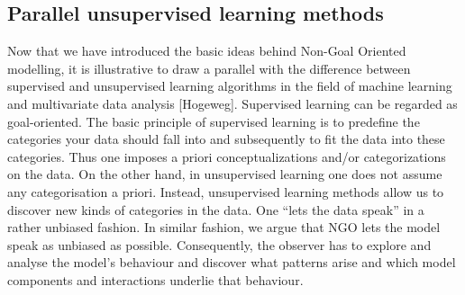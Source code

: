 \subsection{Parallel unsupervised learning methods}

Now that we have introduced the basic ideas behind Non-Goal Oriented modelling, it is illustrative to draw a parallel with the difference between supervised and unsupervised learning algorithms in the field of machine learning and multivariate data analysis [Hogeweg]. Supervised learning can be regarded as goal-oriented. The basic principle of supervised learning is to predefine the categories your data should fall into and subsequently to fit the data into these categories. Thus one imposes a priori conceptualizations and/or categorizations on the data. On the other hand, in unsupervised learning one does not assume any categorisation a priori. Instead, unsupervised learning methods allow us to discover new kinds of categories in the data. One “lets the data speak” in a rather unbiased fashion. In similar fashion, we argue that NGO lets the model speak as unbiased as possible. Consequently, the observer has to explore and analyse the model’s behaviour and discover what patterns arise and which model components and interactions underlie that behaviour.